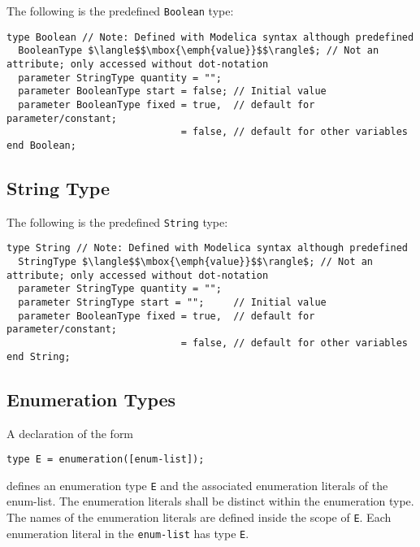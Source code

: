 The following is the predefined \lstinline!Boolean! type:
\begin{lstlisting}[language=modelica]
type Boolean // Note: Defined with Modelica syntax although predefined
  BooleanType $\langle$$\mbox{\emph{value}}$$\rangle$; // Not an attribute; only accessed without dot-notation
  parameter StringType quantity = "";
  parameter BooleanType start = false; // Initial value
  parameter BooleanType fixed = true,  // default for parameter/constant;
                              = false, // default for other variables
end Boolean;
\end{lstlisting}%
%
%
%

\subsection{String Type}\label{string-type}

The following is the predefined \lstinline!String! type:
\begin{lstlisting}[language=modelica]
type String // Note: Defined with Modelica syntax although predefined
  StringType $\langle$$\mbox{\emph{value}}$$\rangle$; // Not an attribute; only accessed without dot-notation
  parameter StringType quantity = "";
  parameter StringType start = "";     // Initial value
  parameter BooleanType fixed = true,  // default for parameter/constant;
                              = false, // default for other variables
end String;
\end{lstlisting}%
%
%

\subsection{Enumeration Types}\label{enumeration-types}

A declaration of the form
\begin{lstlisting}[language=modelica]
type E = enumeration([enum-list]);
\end{lstlisting}%
defines an enumeration type \lstinline!E! and the associated enumeration literals of
the enum-list. The enumeration literals shall be distinct within the
enumeration type. The names of the enumeration literals are defined
inside the scope of \lstinline!E!. Each enumeration literal in the \lstinline!enum-list! has
type \lstinline!E!.

